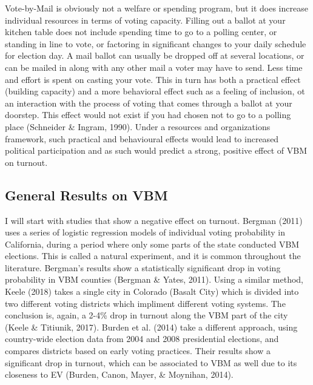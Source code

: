 \documentclass[12pt,twoside]{reedthesis}
\begin{document}
  Vote-by-Mail is obviously not a welfare or spending program, but it does
  increase individual resources in terms of voting capacity. Filling out a
  ballot at your kitchen table does not include spending time to go to a
  polling center, or standing in line to vote, or factoring in significant
  changes to your daily schedule for election day. A mail ballot can
  usually be dropped off at several locations, or can be mailed in along
  with any other mail a voter may have to send. Less time and effort is
  spent on casting your vote. This in turn has both a practical effect
  (building capacity) and a more behavioral effect such as a feeling of
  inclusion, ot an interaction with the process of voting that comes
  through a ballot at your doorstep. This effect would not exist if you
  had chosen not to go to a polling place (Schneider \& Ingram, 1990).
  Under a resources and organizations framework, such practical and
  behavioural effects would lead to increased political participation and
  as such would predict a strong, positive effect of VBM on turnout.
  
  \subsection{General Results on VBM}\label{general-results-on-vbm}
  
  I will start with studies that show a negative effect on turnout.
  Bergman (2011) uses a series of logistic regression models of individual
  voting probability in California, during a period where only some parts
  of the state conducted VBM elections. This is called a natural
  experiment, and it is common throughout the literature. Bergman's
  results show a statistically significant drop in voting probability in
  VBM counties (Bergman \& Yates, 2011). Using a similar method, Keele
  (2018) takes a single city in Colorado (Basalt City) which is divided
  into two different voting districts which impliment different voting
  systems. The conclusion is, again, a 2-4\% drop in turnout along the VBM
  part of the city (Keele \& Titiunik, 2017). Burden et al. (2014) take a
  different approach, using country-wide election data from 2004 and 2008
  presidential elections, and compares districts based on early voting
  practices. Their results show a significant drop in turnout, which can
  be associated to VBM as well due to its closeness to EV (Burden, Canon,
  Mayer, \& Moynihan, 2014).
  
\end{document}
